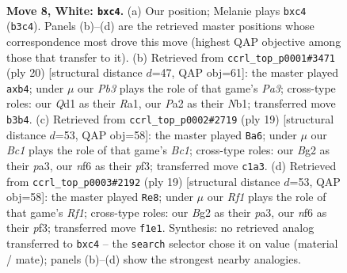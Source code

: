 \documentclass[11pt]{article}
\begin{document}
\begin{figure}[p]\centering
\begin{subfigure}{0.46\textwidth}\centering
\resizebox{\linewidth}{!}{%
\newchessgame
\chessboard[
  setfen={rnbqk2r/pp4pp/2pbpn2/5p2/2pP4/1P3NP1/P3PPBP/RNBQ1RK1 w kq - 0 8},
  showmover=false,
  pgfstyle=straightmove, color=movearrow, markmove={b3-c4}
]}
\caption{}
\end{subfigure}\hfill
\begin{subfigure}{0.46\textwidth}\centering
\resizebox{\linewidth}{!}{%
\newchessgame
\chessboard[
  setfen={1nbqk2r/1p3ppp/r2bpn2/p7/1pPP4/P4NP1/5PBP/RNBQ1RK1 w k - 4 11},
  showmover=false,
  pgfstyle=straightmove, color=movearrow, markmove={a3-b4}
]}
\caption{}
\end{subfigure}
\\[4pt]
\begin{subfigure}{0.46\textwidth}\centering
\resizebox{\linewidth}{!}{%
\newchessgame
\chessboard[
  setfen={rnbq1rk1/p4ppp/1p3n2/2pp4/3P4/P1PBPP2/4N1PP/R1BQK2R b KQ - 1 10},
  showmover=false,
  pgfstyle=straightmove, color=movearrow, markmove={c8-a6}
]}
\caption{}
\end{subfigure}\hfill
\begin{subfigure}{0.46\textwidth}\centering
\resizebox{\linewidth}{!}{%
\newchessgame
\chessboard[
  setfen={rnbq1rk1/p4ppp/1p3n2/2pp4/3P4/P1PBPP2/4N1PP/R1BQK2R b KQ - 1 10},
  showmover=false,
  pgfstyle=straightmove, color=movearrow, markmove={f8-e8}
]}
\caption{}
\end{subfigure}
\caption{\textbf{Move 8, White: \texttt{bxc4}.} (a) Our position; Melanie plays \texttt{bxc4} (\texttt{b3c4}). Panels (b)--(d) are the retrieved master positions whose correspondence most drove this move (highest QAP objective among those that transfer to it). (b) Retrieved from \texttt{ccrl\_top\_p0001\#3471} (ply 20) [structural distance $d$=47, QAP obj=61]: the master played \texttt{axb4}; under $\mu$ our \emph{Pb3} plays the role of that game's \emph{Pa3}; cross-type roles: our \emph{Q}d1 as their \emph{R}a1, our \emph{P}a2 as their \emph{N}b1; transferred move \texttt{b3b4}. (c) Retrieved from \texttt{ccrl\_top\_p0002\#2719} (ply 19) [structural distance $d$=53, QAP obj=58]: the master played \texttt{Ba6}; under $\mu$ our \emph{Bc1} plays the role of that game's \emph{Bc1}; cross-type roles: our \emph{B}g2 as their \emph{p}a3, our \emph{n}f6 as their \emph{p}f3; transferred move \texttt{c1a3}. (d) Retrieved from \texttt{ccrl\_top\_p0003\#2192} (ply 19) [structural distance $d$=53, QAP obj=58]: the master played \texttt{Re8}; under $\mu$ our \emph{Rf1} plays the role of that game's \emph{Rf1}; cross-type roles: our \emph{B}g2 as their \emph{p}a3, our \emph{n}f6 as their \emph{p}f3; transferred move \texttt{f1e1}. Synthesis: no retrieved analog transferred to \texttt{bxc4} -- the \texttt{search} selector chose it on value (material / mate); panels (b)--(d) show the strongest nearby analogies.}
\label{fig:thought-m14}
\end{figure}
\end{document}
